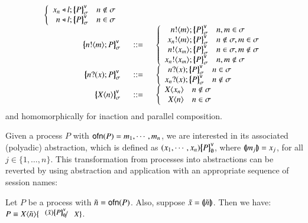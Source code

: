 \begin{definition}
\[\begin{array}{rcl}
		\left\{
		\begin{array}{rl}
			\bsel{x_n}{l} \auxmapp{P}{\mathsf{v}}{\sigma} & n \notin \sigma\\
			\bsel{n}{l} \auxmapp{P}{\mathsf{v}}{\sigma} & n \in \sigma
		\end{array}
		\right.
		\\
		\auxmapp{\bout{n}{m}P}{\mathsf{v}}{\sigma} &\bnfis&
		\left\{
		\begin{array}{rl}
		    \bout{n}{m}\auxmapp{P}{\mathsf{v}}{\sigma} & n, m \in \sigma \\
		    \bout{x_n}{m}\auxmapp{P}{\mathsf{v}}{\sigma} & n \not\in \sigma, m \in \sigma \\
		    \bout{n}{x_m}\auxmapp{P}{\mathsf{v}}{\sigma} & n \in \sigma, m \not\in \sigma \\
		    \bout{x_n}{x_m}\auxmapp{P}{\mathsf{v}}{\sigma} & n, m \not\in \sigma 
		\end{array}
		\right.
		\\
		\auxmapp{\binp{n}{x}P}{\mathsf{v}}{\sigma} &\bnfis&
		\left\{
		\begin{array}{rl}
		    \binp{n}{x}\auxmapp{P}{\mathsf{v}}{\sigma} & n \in \sigma \\
		    \binp{x_n}{x}\auxmapp{P}{\mathsf{v}}{\sigma} & n \not\in \sigma 
		\end{array}
		\right.
		\\
		\auxmapp{\appl{\X}{n}}{\mathsf{v}}{\sigma} &\bnfis&
		\left\{
		\begin{array}{rl}
			\appl{\X}{x_n} & n \notin \sigma\\
			\appl{\X}{n} & n \in \sigma\\
		\end{array}
		\right. 
	\end{array}
\]
and homomorphically for inaction and parallel composition.
\end{definition}

Given a process $P$ with $\mathsf{ofn}(P) = m_1, \cdots, m_n$, we are interested in its associated (polyadic) abstraction, which is defined as
$(x_1, \cdots, x_n)\big\{\!\!\big\{P\big\}\!\!\big\}^\mathsf{v}_\emptyset$, where $(\!|\!|m_j|\!|\!) = x_j$, for all $j \in \{1, \ldots, n\}$.
This transformation from processes into abstractions can be reverted by
using abstraction and application with an appropriate sequence of session names:
%
\begin{proposition}\rm
	Let $P$ be a \HOp process with $\tilde{n} = \mathsf{ofn}(P)$.
	Also, suppose $\tilde{x} = (\!|\!|\tilde{n}|\!|\!)$.
	Then we have: $P \scong \appl{X}{\tilde{n}}\subst{\abs{\tilde{x}}\auxmapp{P}{\mathsf{v}}{\emptyset}}{X}$.
\end{proposition}

